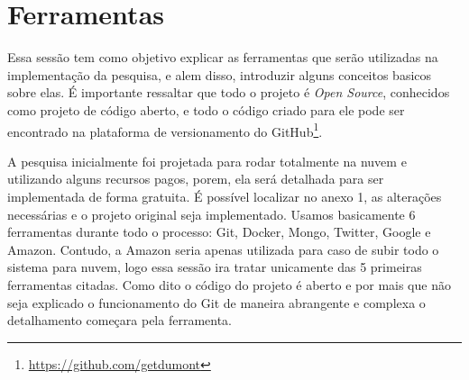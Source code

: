 \section{Ferramentas}
Essa sessão tem como objetivo explicar as ferramentas que serão utilizadas na implementação da pesquisa, e alem disso, introduzir alguns conceitos basicos sobre elas. É importante ressaltar que todo o projeto é \textit{Open Source}, conhecidos como projeto de código aberto, e todo o código criado para ele pode ser encontrado na plataforma de versionamento do GitHub\footnote{\url{https://github.com/getdumont}}.

A pesquisa inicialmente foi projetada para rodar totalmente na nuvem e utilizando alguns recursos pagos, porem, ela será detalhada para ser implementada de forma gratuita. É possível localizar no anexo 1, as alterações necessárias e o projeto original seja implementado. Usamos basicamente 6 ferramentas durante todo o processo: Git, Docker, Mongo, Twitter, Google e Amazon. Contudo, a Amazon seria apenas utilizada para caso de subir todo o sistema para nuvem, logo essa sessão ira tratar unicamente das 5 primeiras ferramentas citadas. Como dito o código do projeto é aberto e por mais que não seja explicado o funcionamento do Git de maneira abrangente e complexa o detalhamento começara pela ferramenta.






